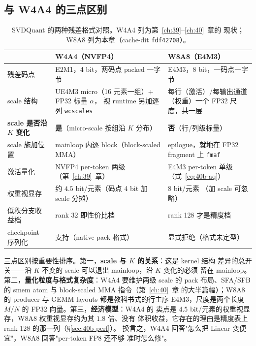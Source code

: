 \subsection{与 W4A4 的三点区别}\label{sec:40b-compare}

\begin{table}[H]
\centering\small
\caption{SVDQuant 的两种残差格式对照。W4A4 列为第~\ref{ch:39}--\ref{ch:40}~章的
现状；W8A8 列为本章（cache-dit \texttt{fdf42708}）。}
\label{tab:40b-compare}
\begin{tabular}{@{}p{2.6cm}p{5.2cm}p{5.2cm}@{}}
\toprule
 & W4A4（NVFP4） & W8A8（E4M3） \\
\midrule
残差码点 & E2M1，4 bit，两码点 packed 一字节 & E4M3，8 bit，一码点一字节 \\
scale 结构 & UE4M3 micro（16 元素一组）+ FP32 标量 $\alpha$，
             视 runtime 另加逐列 \texttt{wcscales} & 每行（激活）/每输出通道
             （权重）一个 FP32 尺度，共一层 \\
\textbf{scale 是否沿 $K$ 变化} & \textbf{是}（micro-scale 按组沿 $K$ 分布） &
             \textbf{否}（行/列级标量） \\
scale 施加位置 & mainloop 内逐 block（block-scaled MMA） &
             epilogue，就地在 FP32 fragment 上 \texttt{fmaf} \\
激活量化 & NVFP4 per-token 两级（第~\ref{ch:39}~章） & E4M3 per-token 单级
             （式~\eqref{eq:40b-aq}） \\
权重视显存 & 约 $4.5$ bit/元素（码点 4 bit 加 scale 分摊） & $8$ bit/元素
             （加 scale 可忽略） \\
低秩分支收益档 & rank 32 即性价比档 & rank 128 才是精度档 \\
checkpoint 序列化 & 支持（native pack 格式） & 显式拒绝（格式未定型） \\
\bottomrule
\end{tabular}
\end{table}

三点区别按重要性排序。第一，\textbf{scale 与 $K$ 的关系}：这是 kernel 结构
差异的总开关——沿 $K$ 不变的 scale 可以退出 mainloop，沿 $K$ 变化的必须
留在 mainloop。第二，\textbf{量化粒度与格式复杂度}：W4A4 要维护两级 scale
的 pack 布局、SFA/SFB 的 smem atom 与 block-scaled MMA 指令（第~\ref{ch:40}~章
的大半篇幅）；W8A8 的 producer 与 GEMM  layouts 都是教科书式的行主序
E4M3，尺度是两个长度 $M$/$N$ 的 FP32 向量。第三，\textbf{经济模型}：W4A4 的
卖点是 $4.5$ bit/元素的权重视显存，W8A8 权重视显存约为其 $1.8$ 倍、没有
体积收益，它存在的理由是精度表上 rank 128 的那一列（\S\ref{sec:40b-perf}）。
换言之，W4A4 回答"怎么把 Linear 变便宜"，W8A8 回答"per-token FP8 还不够
准时怎么修"。

